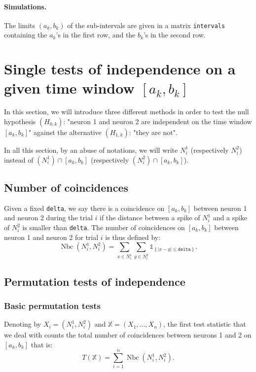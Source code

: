 \documentclass[a4paper,oneside,10pt]{article}
\newcommand{\Nbc}{\operatorname{Nbc}}
\newcommand{\X}{\ensuremath{\mathds{X}}}
\newcommand{\1}[1]{\ensuremath{\mathds{1}_{\left\{ #1 \right\}}}}  %
\begin{document}
\paragraph{Simulations.}
The limits $(a_k,b_k)$ of the sub-intervals are given in a matrix \texttt{intervals} containing the $a_k$'s in the first row, and the $b_k$'s in the second row.

\section{Single tests of independence on a given time window $[a_k,b_k]$}

In this section, we will introduce three different methods in order to test the null hypothesis $(H_{0,k})$: "neuron 1 and neuron 2 are independent on the time window $[a_k,b_k]$" against the alternative $(H_{1,k})$: "they are not".

In all this section, by an abuse of notations, we will write $N^1_i$ (respectively $N^2_i$) instead of $(N^1_i)\cap [a_k,b_k]$ (respectively $(N^2_i)\cap [a_k,b_k]$). 

\subsection{Number of coincidences}

Given a fixed  \texttt{delta}, we say there is a coincidence on $[a_k,b_k]$ between neuron 1 and neuron 2 during the trial $i$ if the distance between a spike of $N^1_i$ and a spike of $N^2_i$ is smaller than \texttt{delta}.
The number of coincidences  on $[a_k,b_k]$  between neuron 1 and neuron 2 for trial $ i$ is thus defined by:
$$\Nbc(N^1_i,N^2_i)=\sum_{x\in N^1_i}\sum_{y\in N^2_i} \1{|x-y|\leq \texttt{delta}}.$$

\subsection{Permutation tests of independence}

\subsubsection{Basic permutation tests}

Denoting by $X_i=(N^1_i,N^2_i)$ and $\X=(X_1,\ldots,X_n)$, the first test statistic that we deal with counts the total number of coincidences between neurons 1 and 2 on  $[a_k,b_k]$ that is:
$$T(\X)=\sum_{i=1}^n \Nbc(N^1_i,N^2_i).$$
\end{document}
